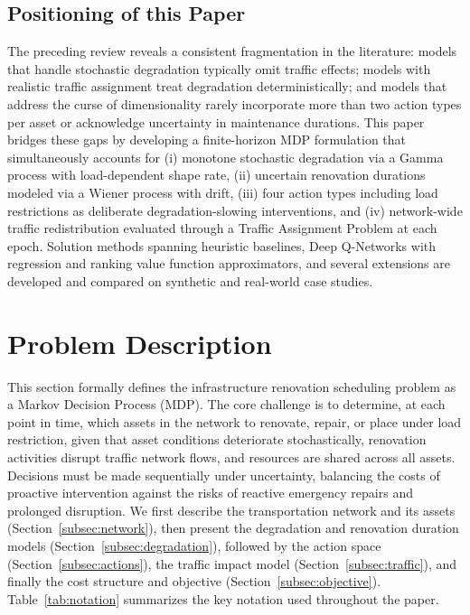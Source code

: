 \documentclass[3p, twocolumn]{elsarticle}
\begin{document}
\subsection{Positioning of this Paper}

The preceding review reveals a consistent fragmentation in the literature: models that handle stochastic degradation typically omit traffic effects; models with realistic traffic assignment treat degradation deterministically; and models that address the curse of dimensionality rarely incorporate more than two action types per asset or acknowledge uncertainty in maintenance durations. This paper bridges these gaps by developing a finite-horizon MDP formulation that simultaneously accounts for (i) monotone stochastic degradation via a Gamma process with load-dependent shape rate, (ii) uncertain renovation durations modeled via a Wiener process with drift, (iii) four action types including load restrictions as deliberate degradation-slowing interventions, and (iv) network-wide traffic redistribution evaluated through a Traffic Assignment Problem at each epoch. Solution methods spanning heuristic baselines, Deep Q-Networks with regression and ranking value function approximators, and several extensions are developed and compared on synthetic and real-world case studies.

\section{Problem Description}
\label{sec:problem}

This section formally defines the infrastructure renovation scheduling problem as a Markov Decision Process (MDP). The core challenge is to determine, at each point in time, which assets in the network to renovate, repair, or place under load restriction, given that asset conditions deteriorate stochastically, renovation activities disrupt traffic network flows, and resources are shared across all assets. Decisions must be made sequentially under uncertainty, balancing the costs of proactive intervention against the risks of reactive emergency repairs and prolonged disruption. We first describe the transportation network and its assets (Section~\ref{subsec:network}), then present the degradation and renovation duration models (Section~\ref{subsec:degradation}), followed by the action space (Section~\ref{subsec:actions}), the traffic impact model (Section~\ref{subsec:traffic}), and finally the cost structure and objective (Section~\ref{subsec:objective}). Table~\ref{tab:notation} summarizes the key notation used throughout the paper.
\end{document}
